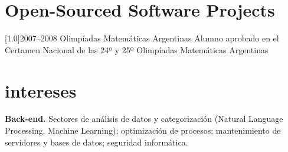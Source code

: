 \documentclass[]{cv-style}     %
\begin{document}
\section{Open-Sourced Software Projects}
  \vspace{-0.2cm}
\begin{entrylist}
\entry
{\scalebox{.8}[1.0]{2007--2008}}
{Olimpíadas Matemáticas Argentinas}
{}
{Alumno aprobado en el Certamen Nacional de las 24º y 25º Olimpíadas Matemáticas Argentinas}
\end{entrylist}
  \vspace{-0.2cm}
\section{intereses}
  \vspace{-0.2cm}
\textbf{Back-end.} Sectores de análisis de datos y categorización (Natural Language Processing, Machine Learning); optimización de procesos; mantenimiento de servidores y bases de datos; seguridad informática.
\end{document}
